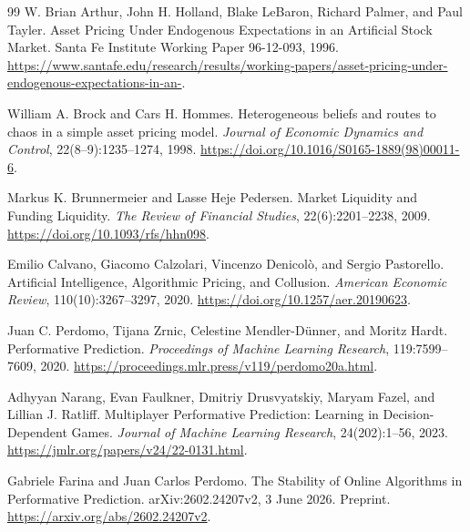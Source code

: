 \documentclass[11pt,a4paper]{article}
\theoremstyle{definition}
\theoremstyle{remark}
\begin{document}
\clearpage
\begingroup
\small
\setlength{\bibsep}{4pt}
\begin{thebibliography}{99}
W. Brian Arthur, John H. Holland, Blake LeBaron, Richard Palmer, and Paul Tayler.
\newblock Asset Pricing Under Endogenous Expectations in an Artificial Stock Market.
\newblock Santa Fe Institute Working Paper 96-12-093, 1996.
\newblock \url{https://www.santafe.edu/research/results/working-papers/asset-pricing-under-endogenous-expectations-in-an-}.

William A. Brock and Cars H. Hommes.
\newblock Heterogeneous beliefs and routes to chaos in a simple asset pricing model.
\newblock \emph{Journal of Economic Dynamics and Control}, 22(8--9):1235--1274, 1998.
\newblock \url{https://doi.org/10.1016/S0165-1889(98)00011-6}.

Markus K. Brunnermeier and Lasse Heje Pedersen.
\newblock Market Liquidity and Funding Liquidity.
\newblock \emph{The Review of Financial Studies}, 22(6):2201--2238, 2009.
\newblock \url{https://doi.org/10.1093/rfs/hhn098}.

Emilio Calvano, Giacomo Calzolari, Vincenzo Denicol\`o, and Sergio Pastorello.
\newblock Artificial Intelligence, Algorithmic Pricing, and Collusion.
\newblock \emph{American Economic Review}, 110(10):3267--3297, 2020.
\newblock \url{https://doi.org/10.1257/aer.20190623}.

Juan C. Perdomo, Tijana Zrnic, Celestine Mendler-D\"unner, and Moritz Hardt.
\newblock Performative Prediction.
\newblock \emph{Proceedings of Machine Learning Research}, 119:7599--7609, 2020.
\newblock \url{https://proceedings.mlr.press/v119/perdomo20a.html}.

Adhyyan Narang, Evan Faulkner, Dmitriy Drusvyatskiy, Maryam Fazel, and Lillian J. Ratliff.
\newblock Multiplayer Performative Prediction: Learning in Decision-Dependent Games.
\newblock \emph{Journal of Machine Learning Research}, 24(202):1--56, 2023.
\newblock \url{https://jmlr.org/papers/v24/22-0131.html}.

Gabriele Farina and Juan Carlos Perdomo.
\newblock The Stability of Online Algorithms in Performative Prediction.
\newblock arXiv:2602.24207v2, 3 June 2026. Preprint.
\newblock \url{https://arxiv.org/abs/2602.24207v2}.


\end{thebibliography}
\end{document}
